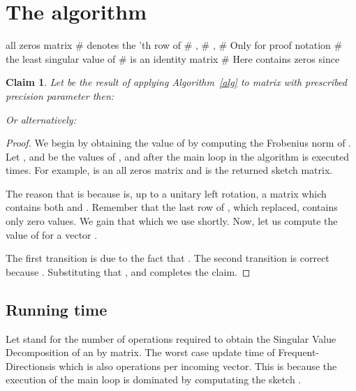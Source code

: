 \documentclass[]{article}
\newcommand{\FD}{Frequent-Directions}
\newtheorem{claim}{Claim}
\begin{document}
\section{The algorithm}\label{thealg}

\begin{algorithm} 
\caption{\FD}
\label{alg}
\begin{algorithmic}
\STATE 
\STATE  all zeros matrix   
\FOR{}
	\STATE   \hfill \#  denotes the 'th row of 
	\STATE   \hfill \# ,  \;
	\STATE \hfill \# ,  \;
	\STATE   \hfill \# Only for proof notation
	\STATE  \hfill \#  the least singular value of 
	\STATE  \hfill \#  is an  identity matrix
	\STATE  \hfill \# Here  contains zeros since 
\ENDFOR
{}  
\end{algorithmic}
\end{algorithm}

\begin{claim}
Let  be the result of applying Algorithm~\ref{alg} to matrix  with prescribed precision parameter  then:
 
\noindent Or alternatively:

\end{claim}

\begin{proof}
We begin by obtaining the value of  by computing the Frobenius norm of .
Let ,  and  be the values of ,  and  after the main loop in the algorithm is executed  times.
For example,  is an all zeros matrix and  is the returned sketch matrix.

The reason that  is because  is, up to a unitary left rotation, a matrix which contains both  and . Remember that the last row of , which  replaced, contains only zero values.
We gain that  which we use shortly.
Now, let us compute the value of  for a vector . 

The first transition is due to the fact that .
The second transition is correct because .
Substituting that ,  and  completes the claim.
\end{proof}

\subsection{Running time}\label{run}
Let  stand for the number of operations required to obtain the Singular Value Decomposition of an  by  matrix.
The worst case update time of \FD is  which is also  operations per incoming vector. 
This is because the execution of the main loop is dominated by computating  the sketch .
\end{document}
